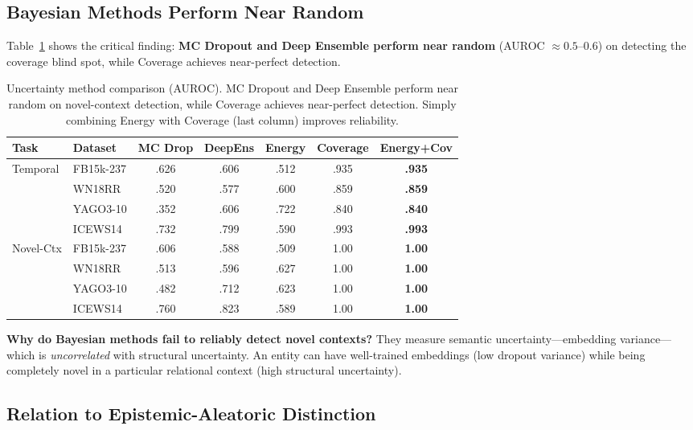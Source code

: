 \documentclass{article}
\begin{document}
\subsection{Bayesian Methods Perform Near Random}

Table~\ref{tab:auroc} shows the critical finding: \textbf{MC Dropout and Deep Ensemble perform near random} (AUROC $\approx 0.5$--$0.6$) on detecting the coverage blind spot, while Coverage achieves near-perfect detection.

\begin{table}[htbp]
\centering
\caption{Uncertainty method comparison (AUROC). MC Dropout and Deep Ensemble perform near random on novel-context detection, while Coverage achieves near-perfect detection. Simply combining Energy with Coverage (last column) improves reliability.}
\label{tab:auroc}
\begin{tabular}{llccccc}
\toprule
Task & Dataset & MC Drop & DeepEns & Energy & Coverage & Energy+Cov \\
\midrule
\multirow{4}{*}{Temporal}
& FB15k-237 & .626 & .606 & .512 & .935 & \textbf{.935} \\
& WN18RR & .520 & .577 & .600 & .859 & \textbf{.859} \\
& YAGO3-10 & .352 & .606 & .722 & .840 & \textbf{.840} \\
& ICEWS14 & .732 & .799 & .590 & .993 & \textbf{.993} \\
\midrule
\multirow{4}{*}{Novel-Ctx}
& FB15k-237 & .606 & .588 & .509 & 1.00 & \textbf{1.00} \\
& WN18RR & .513 & .596 & .627 & 1.00 & \textbf{1.00} \\
& YAGO3-10 & .482 & .712 & .623 & 1.00 & \textbf{1.00} \\
& ICEWS14 & .760 & .823 & .589 & 1.00 & \textbf{1.00} \\
\bottomrule
\end{tabular}
\end{table}

\textbf{Why do Bayesian methods fail to reliably detect novel contexts?} They measure semantic uncertainty---embedding variance---which is \emph{uncorrelated} with structural uncertainty. An entity can have well-trained embeddings (low dropout variance) while being completely novel in a particular relational context (high structural uncertainty).

\subsection{Relation to Epistemic-Aleatoric Distinction}
\end{document}
